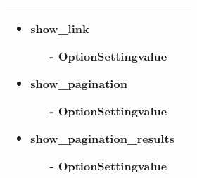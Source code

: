 \begin{minipage}{0.63\textwidth}
\begin{tabular}{|p{} | p{}|}
\begin{itemize}
\begin{enumerate}
 \end{enumerate}  
\item show\_link
 \begin{enumerate}
    \item[-] OptionSettingvalue
 \end{enumerate} 
\item show\_pagination
 \begin{enumerate}
    \item[-] OptionSettingvalue
 \end{enumerate}  
\item show\_pagination\_results 
\begin{enumerate}
    \item[-] OptionSettingvalue
 \end{enumerate}  
\end{itemize}
\\
\hline
\end{tabular}
\end{minipage}

